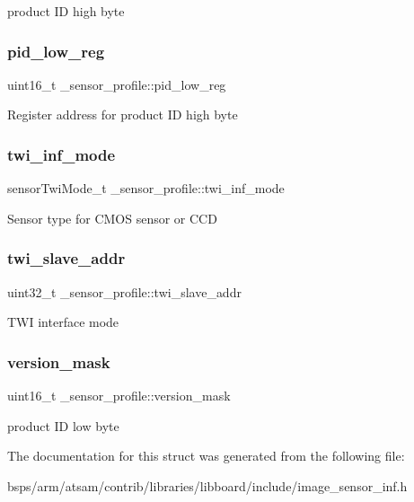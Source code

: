 product ID high byte \mbox{\label{struct__sensor__profile_a2192ed350ad585ffdda6874ad87b85cc}} 
\subsubsection{\texorpdfstring{pid\_low\_reg}{pid\_low\_reg}}
{\footnotesize\ttfamily uint16\+\_\+t \+\_\+sensor\+\_\+profile\+::pid\+\_\+low\+\_\+reg}

Register address for product ID high byte \mbox{\label{struct__sensor__profile_a4430b6708817fd7531dfcb1ff801489a}} 
\subsubsection{\texorpdfstring{twi\_inf\_mode}{twi\_inf\_mode}}
{\footnotesize\ttfamily sensor\+Twi\+Mode\+\_\+t \+\_\+sensor\+\_\+profile\+::twi\+\_\+inf\+\_\+mode}

Sensor type for C\+M\+OS sensor or C\+CD \mbox{\label{struct__sensor__profile_aacbadee8d6c886bfc6b4eae6952d38ce}} 
\subsubsection{\texorpdfstring{twi\_slave\_addr}{twi\_slave\_addr}}
{\footnotesize\ttfamily uint32\+\_\+t \+\_\+sensor\+\_\+profile\+::twi\+\_\+slave\+\_\+addr}

T\+WI interface mode \mbox{\label{struct__sensor__profile_a6292d1fe4fee17efe8ef4a7a8ee58676}} 
\subsubsection{\texorpdfstring{version\_mask}{version\_mask}}
{\footnotesize\ttfamily uint16\+\_\+t \+\_\+sensor\+\_\+profile\+::version\+\_\+mask}

product ID low byte 

The documentation for this struct was generated from the following file\+:\begin{DoxyCompactItemize}
\item 
bsps/arm/atsam/contrib/libraries/libboard/include/image\+\_\+sensor\+\_\+inf.\+h\end{DoxyCompactItemize}
